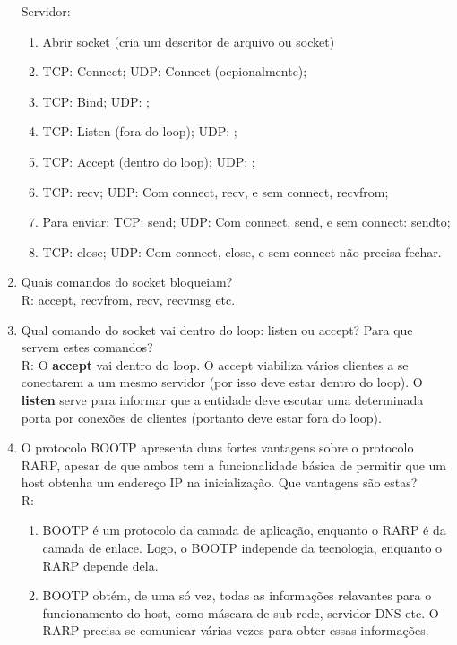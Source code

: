 \documentclass{article}
\begin{document}
\begin{enumerate}
   Servidor:

      \begin{enumerate}
         \item Abrir socket (cria um descritor de arquivo ou socket)
         \item TCP: Connect; UDP: Connect (ocpionalmente);
         \item TCP: Bind; UDP: ;
         \item TCP: Listen (fora do loop); UDP: ;
         \item TCP: Accept (dentro do loop); UDP: ;
         \item TCP: recv; UDP: Com connect, recv, e sem connect, recvfrom;
         \item Para enviar: TCP: send; UDP: Com connect, send, e sem connect: sendto;
         \item TCP: close; UDP: Com connect, close, e sem connect não precisa fechar.
      \end{enumerate}
	

	\item Quais comandos do socket bloqueiam?
   \\R: accept, recvfrom, recv, recvmsg etc.	

	\item Qual comando do socket vai dentro do loop: listen ou accept? Para que servem estes comandos?
	\\ 
	R: O \textbf{accept} vai dentro do loop. O accept viabiliza vários clientes a se conectarem a um mesmo servidor (por isso deve estar dentro do loop). O \textbf{listen} serve para informar que a entidade deve escutar uma determinada porta por conexões de clientes (portanto deve estar fora do loop).

	
	\item O protocolo BOOTP apresenta duas fortes vantagens sobre o protocolo RARP, apesar de que ambos tem a funcionalidade básica de permitir que um host obtenha um endereço IP na inicialização. Que vantagens são estas?
	\\
	R:
	\begin{enumerate}
		\item BOOTP é um protocolo da camada de aplicação, enquanto o RARP é da
		camada de enlace. Logo, o BOOTP independe da tecnologia, enquanto o RARP
		depende dela.
		\item BOOTP obtém, de uma só vez, todas as informações relavantes para o
		funcionamento do host, como máscara de sub-rede, servidor DNS etc. O
		RARP precisa se comunicar várias vezes para obter essas informações.
	\end{enumerate}




\end{enumerate}
\end{document}
